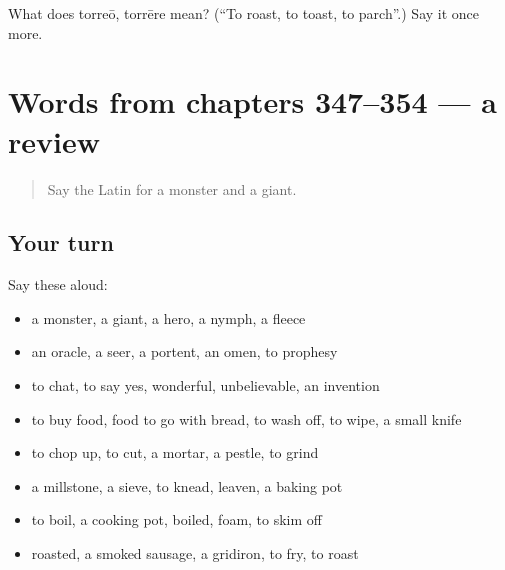 \begin{tcolorbox}[breakable,colback=teal!4,colframe=teal!35!black,title={Before you move on}]
What does torreō, torrēre mean? (\textquotedblleft{}To roast, to toast, to parch\textquotedblright{}.) Say it once more.
\end{tcolorbox}
\section[(dialogue)]{Words from chapters 347–354 — a review}

\label{lesson:LA-R354-review-347-354}



\begin{quote}
Say the Latin for a monster and a giant.
\end{quote}

\subsection*{Your turn}
Say these aloud:

\begin{itemize}
\raggedright
  \item a monster, a giant, a hero, a nymph, a fleece
  \item an oracle, a seer, a portent, an omen, to prophesy
  \item to chat, to say yes, wonderful, unbelievable, an invention
  \item to buy food, food to go with bread, to wash off, to wipe, a small knife
  \item to chop up, to cut, a mortar, a pestle, to grind
  \item a millstone, a sieve, to knead, leaven, a baking pot
  \item to boil, a cooking pot, boiled, foam, to skim off
  \item roasted, a smoked sausage, a gridiron, to fry, to roast
\end{itemize}

